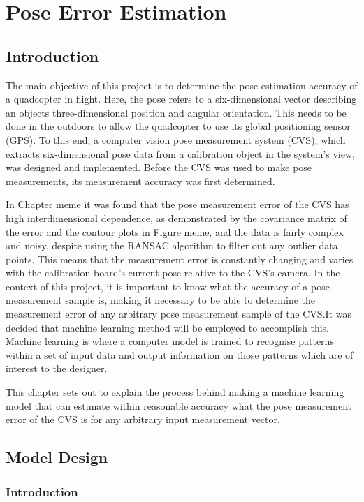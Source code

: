 \chapter{Pose Error Estimation}

\section{Introduction}

The main objective of this project is to determine the pose estimation accuracy of a quadcopter in flight. Here, the pose refers to a six-dimensional vector describing an objects three-dimensional position and angular orientation. This needs to be done in the outdoors to allow the quadcopter to use its global positioning sensor (GPS). To this end, a computer vision pose measurement system (CVS), which extracts six-dimensional pose data from a calibration object in the system's view, was designed and implemented. Before the CVS was used to make pose measurements, its measurement accuracy was first determined. 

In Chapter meme it was found that the pose measurement error of the CVS has high interdimensional dependence, as demonstrated by the covariance matrix of the error and the contour plots in Figure meme, and the data is fairly complex and noisy, despite using the RANSAC algorithm to filter out any outlier data points. This means that the measurement error is constantly changing and varies with the calibration board's current pose relative to the CVS's camera. In the context of this project, it is important to know what the accuracy of a pose measurement sample is, making it necessary to be able to determine the measurement error of any arbitrary pose measurement sample of the CVS.\@ It was decided that machine learning method will be employed to accomplish this. Machine learning is where a computer model is trained to recognise patterns within a set of input data and output information on those patterns which are of interest to the designer. 

This chapter sets out to explain the process behind making a machine learning model that can estimate within reasonable accuracy what the pose measurement error of the CVS is for any arbitrary input measurement vector. 

\section{Model Design}

\subsection{Introduction}

